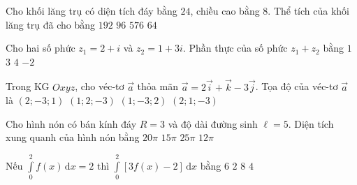 \begin{ex}%
	Cho khối lăng trụ có diện tích đáy bằng $24$, chiều cao bằng $8$. Thể tích của khối lăng trụ đã cho bằng
	\choice
	{\True $192$}
	{$96$}
	{$576$}
	{$64$}
\end{ex}

\begin{ex}%
	Cho hai số phức $z_1=2+i$ và $z_2=1+3i$. Phần thực của số phức $z_1+z_2$ bằng
	\choice
	{$1$}
	{\True $3$}
	{$4$}
	{$-2$}
\end{ex}

\begin{ex}%
	Trong KG $Oxyz$, cho véc-tơ $\overrightarrow{a}$ thỏa mãn $\overrightarrow{a}=2\overrightarrow{i}+\overrightarrow{k}-3\overrightarrow{j}$. Tọa độ của véc-tơ $\overrightarrow{a}$ là
	\choice
	{\True $\left(2;-3;1\right)$}
	{$\left(1;2;-3\right)$}
	{$\left(1;-3;2\right)$}
	{$\left(2;1;-3\right)$}
\end{ex}

\begin{ex}%
	Cho hình nón có bán kính đáy $R=3$ và độ dài đường sinh $\ell=5$. Diện tích xung quanh của hình nón bằng
	\choice
	{$20\pi$}
	{\True $15\pi$}
	{$25\pi$}
	{$12\pi$}
\end{ex}

\begin{ex}%
	Nếu $\displaystyle\int\limits_0^2f(x)\mathrm{\,d}x=2$ thì $\displaystyle\int\limits_0^2\left[3f(x)-2\right]\mathrm{\,d}x$ bằng
	\choice
	{$6$}
	{\True $2$}
	{$8$}
	{$4$}
\end{ex}

